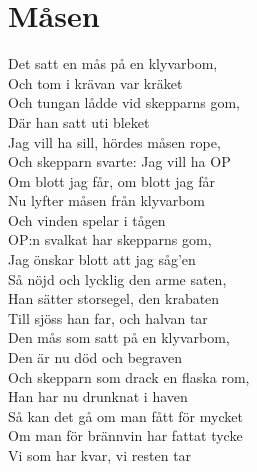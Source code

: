 \section{Måsen}
Det satt en mås på en klyvarbom,\\
Och tom i krävan var kräket\\
Och tungan lådde vid skepparns gom,\\
Där han satt uti bleket\\
Jag vill ha sill, hördes måsen rope,\\
Och skepparn svarte: Jag vill ha OP\\
Om blott jag får, om blott jag får\\

Nu lyfter måsen från klyvarbom\\
Och vinden spelar i tågen\\
OP:n svalkat har skepparns gom,\\
Jag önskar blott att jag såg’en\\
Så nöjd och lycklig den arme saten,\\
Han sätter storsegel, den krabaten\\
Till sjöss han far, och halvan tar\\

Den mås som satt på en klyvarbom,\\
Den är nu död och begraven\\
Och skepparn som drack en flaska rom,\\
Han har nu drunknat i haven\\
Så kan det gå om man fått för mycket\\
Om man för brännvin har fattat tycke\\
Vi som har kvar, vi resten tar\\

